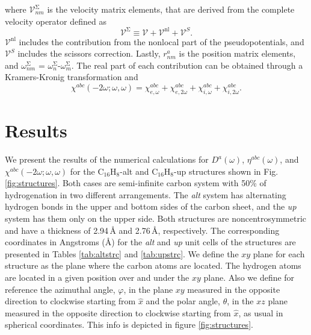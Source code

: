 \documentclass[pss]{wiley2sp} %
\begin{document}
where $\mathcal{V}^{\mathrm{\Sigma}}_{nm}$ is the velocity matrix elements,
that are derived from the complete velocity operator defined as
\begin{equation*}\label{eq:nonlocal}
\boldsymbol{\mathcal{V}}^{\mathrm{\Sigma}}\equiv
\boldsymbol{\mathcal{V}}+
\boldsymbol{\mathcal{V}}^{\mathrm{nl}}+
\boldsymbol{\mathcal{V}}^{S}.
\end{equation*}
$\boldsymbol{\mathcal{V}}^{\mathrm{nl}}$ includes the contribution from the
nonlocal part of the pseudopotentials, and $\boldsymbol{\mathcal{V}}^{S}$
includes the scissors correction. Lastly, $r^{a}_{nm}$ is the position matrix
elements, and $\omega^\mathrm{\Sigma}_{nm}$ =
$\omega^{\mathrm{\Sigma}}_{n}$-$\omega^{\mathrm{\Sigma}}_{m}$. The real part
of each contribution can be obtained through a Kramers-Kronig transformation
\cite{tancognePRB14} and
\begin{equation}\label{eq:chitotal}
\chi^{abc} (-2\omega;\omega,\omega) =
\chi^{abc}_{e,\omega} + \chi^{abc}_{e,2\omega} +
\chi^{abc}_{i,\omega} + \chi^{abc}_{i,2\omega}.
\end{equation}

\section{Results}\label{sec:results}

We present the results of the numerical calculations for {$D^{a}(\omega)$}, {$\eta^{abc}(\omega)$}, and $\chi^{abc}(-2\omega;\omega,\omega)$ for the C$_{16}$H$_{8}$-alt and C$_{16}$H$_{8}$-up structures shown in Fig. \ref{fig:structures}. Both cases are semi-infinite carbon system with 50\% of hydrogenation in two different arrangements. The \emph{alt} system has alternating hydrogen bonds in the upper and bottom sides of the carbon sheet, and the \emph{up} system has them only on the upper side. Both structures are noncentrosymmetric and have a thickness of 2.94\,{\AA} and 2.76\,{\AA}, respectively. The corresponding coordinates in Angstroms (\AA) for the \emph{alt} and \emph{up} unit cells of the structures are presented in Tables \ref{tab:altstrc} and \ref{tab:upstrc}.
We define the $xy$ plane for each structure as the plane where the carbon atoms are located. The hydrogen atoms are located in a given  position over and under the $xy$ plane. Also we define for reference the azimuthal angle, $\varphi$, in the plane $xy$ measured in the opposite direction to clockwise starting from $\hat{x}$ and the polar angle, $\theta$, in the $xz$ plane measured in the opposite direction to clockwise starting from $\hat{x}$, as usual in spherical coordinates. This info is depicted in figure \ref{fig:structures}.
\end{document}
